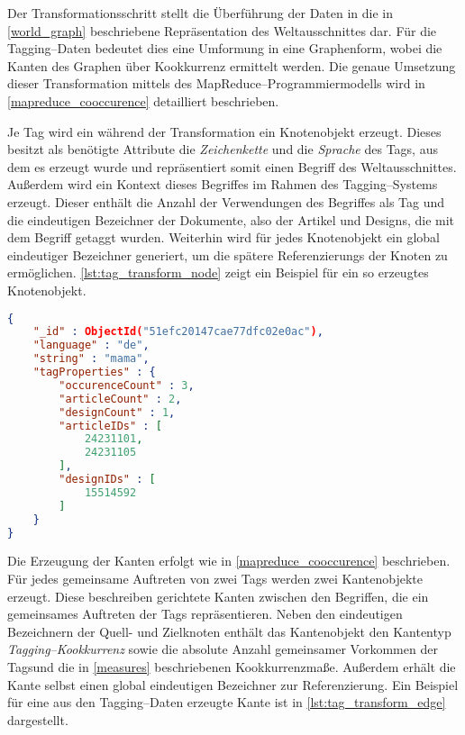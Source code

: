 Der Transformationsschritt stellt die Überführung der Daten in die in \cref{world_graph} beschriebene Repräsentation des Weltausschnittes dar. Für die Tagging--Daten bedeutet dies eine Umformung in eine Graphenform, wobei die Kanten des Graphen über Kookkurrenz ermittelt werden. Die genaue Umsetzung dieser Transformation mittels des MapReduce--Programmiermodells wird in \cref{mapreduce_cooccurence} detailliert beschrieben.

Je Tag wird ein während der Transformation ein Knotenobjekt erzeugt. Dieses besitzt als benötigte Attribute die \emph{Zeichenkette} und die \emph{Sprache} des Tags, aus dem es erzeugt wurde und repräsentiert somit einen Begriff des Weltausschnittes. Außerdem wird ein Kontext dieses Begriffes im Rahmen des Tagging--Systems erzeugt. Dieser enthält die Anzahl der Verwendungen des Begriffes als Tag und die eindeutigen Bezeichner der Dokumente, also der Artikel und Designs, die mit dem Begriff getaggt wurden. Weiterhin wird für jedes Knotenobjekt ein global eindeutiger Bezeichner generiert, um die spätere Referenzierungs der Knoten zu ermöglichen. \cref{lst:tag_transform_node} zeigt ein Beispiel für ein so erzeugtes Knotenobjekt.

\begin{lstlisting}[language=json, label={lst:tag_transform_node}, caption={JSON--Beispiel für einen aus den Tagging--Daten erzeugten Knoten}, float=h]
{
    "_id" : ObjectId("51efc20147cae77dfc02e0ac"),
    "language" : "de",
    "string" : "mama",
    "tagProperties" : {
        "occurenceCount" : 3,
        "articleCount" : 2,
        "designCount" : 1,
        "articleIDs" : [
            24231101,
            24231105
        ],
        "designIDs" : [
            15514592
        ]
    }
}
\end{lstlisting}

Die Erzeugung der Kanten erfolgt wie in \cref{mapreduce_cooccurence} beschrieben. Für jedes gemeinsame Auftreten von zwei Tags werden zwei Kantenobjekte erzeugt. Diese beschreiben gerichtete Kanten zwischen den Begriffen, die ein gemeinsames Auftreten der Tags repräsentieren. Neben den eindeutigen Bezeichnern der Quell- und Zielknoten enthält das Kantenobjekt den Kantentyp \emph{Tagging--Kookkurrenz} sowie die absolute Anzahl gemeinsamer Vorkommen der Tagsund die in \cref{measures} beschriebenen Kookkurrenzmaße. Außerdem erhält die Kante selbst einen global eindeutigen Bezeichner zur Referenzierung. Ein Beispiel für eine aus den Tagging--Daten erzeugte Kante ist in \cref{lst:tag_transform_edge} dargestellt.

